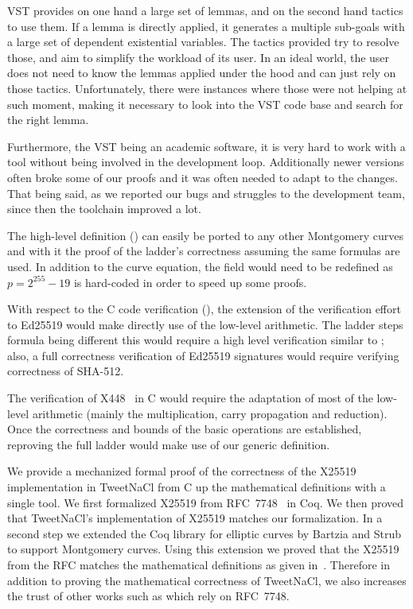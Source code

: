VST provides on one hand a large set of lemmas, and on the second hand tactics to use them.
If a lemma is directly applied, it generates a multiple sub-goals with a large set of dependent existential variables.
The tactics provided try to resolve those, and aim to simplify the workload of its user.
In an ideal world, the user does not need to know the lemmas applied under the hood and can just rely on those tactics.
Unfortunately, there were instances where those were not helping
at such moment, making it necessary to look into the VST code base and search for the right lemma.

Furthermore, the VST being an academic software, it is very hard to work with a tool
without being involved in the development loop. Additionally newer versions often broke
some of our proofs and it was often needed to adapt to the changes. That being said,
as we reported our bugs and struggles to the development team, since then the toolchain improved a lot.

The high-level definition () can easily be ported to any
other Montgomery curves and with it the proof of the ladder's correctness
assuming the same formulas are used.
In addition to the curve equation, the field  would need to be redefined
as $p=2^{255}-19$ is hard-coded in order to speed up some proofs.

With respect to the C code verification (), the extension of
the verification effort to Ed25519 would make directly use of the low-level
arithmetic. The ladder steps formula being different this would require a high
level verification similar to ;
also, a full correctness verification of Ed25519 signatures would require
verifying correctness of SHA-512.

The verification of \eg X448~\cite{cryptoeprint:2015:625,rfc7748} in C would
require the adaptation of most of the low-level arithmetic (mainly the
multiplication, carry propagation and reduction).
Once the correctness and bounds of the basic operations are established,
reproving the full ladder would make use of our generic definition.

We provide a mechanized formal proof of the correctness of the X25519
implementation in TweetNaCl from C up the mathematical definitions with a single tool.
We first formalized X25519 from RFC~7748~\cite{rfc7748} in Coq.
We then proved that TweetNaCl's implementation of X25519 matches our formalization.
In a second step we extended the Coq library for elliptic curves \cite{BartziaS14}
by Bartzia and Strub to support Montgomery curves.
Using this extension we proved that the X25519 from the RFC matches the
mathematical definitions as given in~\cite[Sec.~2]{Ber06}.
Therefore in addition to proving the mathematical correctness of TweetNaCl,
we also increases the trust of other works such as
\cite{zinzindohoue2017hacl,Erbsen2016SystematicSO} which rely on RFC~7748.
